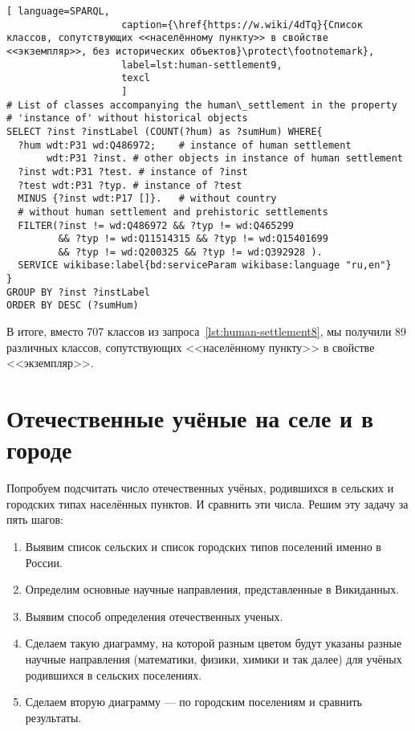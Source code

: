 \lstset{numbers=left, firstnumber=1, frame=single}
\begin{lstlisting}[ language=SPARQL, 
                    caption={\href{https://w.wiki/4dTq}{Cписок классов, сопутствующих <<населённому пункту>> в свойстве <<экземпляр>>, без исторических объектов}\protect\footnotemark},
                    label=lst:human-settlement9,
                    texcl 
                    ]
# List of classes accompanying the human\_settlement in the property
# 'instance of' without historical objects 
SELECT ?inst ?instLabel (COUNT(?hum) as ?sumHum) WHERE{
  ?hum wdt:P31 wd:Q486972;    # instance of human settlement
       wdt:P31 ?inst. # other objects in instance of human settlement
  ?inst wdt:P31 ?test. # instance of ?inst
  ?test wdt:P31 ?typ. # instance of ?test
  MINUS {?inst wdt:P17 []}.   # without country
  # without human settlement and prehistoric settlements
  FILTER(?inst != wd:Q486972 && ?typ != wd:Q465299 
         && ?typ != wd:Q11514315 && ?typ != wd:Q15401699 
         && ?typ != wd:Q200325 && ?typ != wd:Q392928 ). 
  SERVICE wikibase:label{bd:serviceParam wikibase:language "ru,en"}
}
GROUP BY ?inst ?instLabel
ORDER BY DESC (?sumHum)
\end{lstlisting}%

В итоге, вместо 707 классов из запроса~\ref{lst:human-settlement8}, 
мы получили 89 различных классов, сопутствующих <<населённому пункту>> в свойстве <<экземпляр>>. 



\section{Отечественные учёные на селе и в городе}

Попробуем подсчитать число отечественных учёных, родившихся в сельских и городских типах населённых пунктов. И сравнить эти числа.
Решим эту задачу за пять шагов:
\begin{enumerate}
  \item Выявим список сельских и список городских типов поселений именно в России.
  \item Определим основные научные направления, представленные в Викиданных.
  \item Выявим способ определения отечественных ученых.
  \item Сделаем такую диаграмму, на которой разным цветом будут указаны разные научные направления (математики, физики, химики и так далее) для учёных родившихся в сельских поселениях.
  \item Сделаем вторую диаграмму — по городским поселениям и сравнить результаты.
\end{enumerate}

